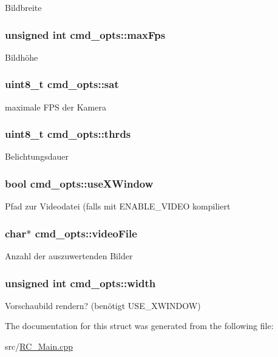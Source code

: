 Bildbreite \hypertarget{structcmd__opts_a2b42f4e7bd954f5ac87c82e9d19a9b84}{
\subsubsection[{max\+Fps}]{\setlength{\rightskip}{0pt plus 5cm}unsigned int cmd\+\_\+opts\+::max\+Fps}}\label{structcmd__opts_a2b42f4e7bd954f5ac87c82e9d19a9b84}
Bildhöhe \hypertarget{structcmd__opts_aa83f2910f6a1803ee8c9f9e3581db314}{
\subsubsection[{sat}]{\setlength{\rightskip}{0pt plus 5cm}uint8\+\_\+t cmd\+\_\+opts\+::sat}}\label{structcmd__opts_aa83f2910f6a1803ee8c9f9e3581db314}
maximale F\+P\+S der Kamera \hypertarget{structcmd__opts_a7518cdbdbc6ed1b8cc404aa675f383a6}{
\subsubsection[{thrds}]{\setlength{\rightskip}{0pt plus 5cm}uint8\+\_\+t cmd\+\_\+opts\+::thrds}}\label{structcmd__opts_a7518cdbdbc6ed1b8cc404aa675f383a6}
Belichtungsdauer \hypertarget{structcmd__opts_aee44e8161de659e8fff50e09100f9ada}{
\subsubsection[{use\+X\+Window}]{\setlength{\rightskip}{0pt plus 5cm}bool cmd\+\_\+opts\+::use\+X\+Window}}\label{structcmd__opts_aee44e8161de659e8fff50e09100f9ada}
Pfad zur Videodatei (falls mit E\+N\+A\+B\+L\+E\+\_\+\+V\+I\+D\+E\+O kompiliert \hypertarget{structcmd__opts_acee5a1c6793898bbda38d6d7fb5de431}{
\subsubsection[{video\+File}]{\setlength{\rightskip}{0pt plus 5cm}char$\ast$ cmd\+\_\+opts\+::video\+File}}\label{structcmd__opts_acee5a1c6793898bbda38d6d7fb5de431}
Anzahl der auszuwertenden Bilder \hypertarget{structcmd__opts_a0f13b6290e7e33c22a258c11ed23f72f}{
\subsubsection[{width}]{\setlength{\rightskip}{0pt plus 5cm}unsigned int cmd\+\_\+opts\+::width}}\label{structcmd__opts_a0f13b6290e7e33c22a258c11ed23f72f}
Vorschaubild rendern? (benötigt U\+S\+E\+\_\+\+X\+W\+I\+N\+D\+O\+W) 

The documentation for this struct was generated from the following file\+:\begin{DoxyCompactItemize}
\item 
src/\hyperlink{RC__Main_8cpp}{R\+C\+\_\+\+Main.\+cpp}\end{DoxyCompactItemize}
